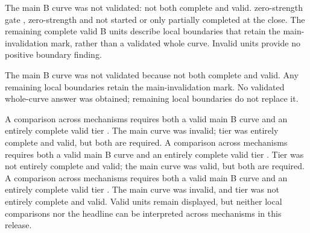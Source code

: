 The main B curve was not validated:    not both complete and valid.   zero-strength gate ,  zero-strength  and   not started or only partially completed at the close. %
The remaining complete valid B units describe local boundaries that retain the main-invalidation mark, rather than a validated whole curve. Invalid units provide no positive boundary finding. %

The main B curve was not validated because    not both complete and valid. Any remaining local boundaries retain the main-invalidation mark. %
No validated whole-curve answer was obtained; remaining local boundaries do not replace it.

A comparison across mechanisms requires both a valid main B curve and an entirely complete valid tier . The main curve was invalid; tier  was entirely complete and valid, but both are required. %
A comparison across mechanisms requires both a valid main B curve and an entirely complete valid tier . Tier  was not entirely complete and valid; the main curve was valid, but both are required. %
A comparison across mechanisms requires both a valid main B curve and an entirely complete valid tier . The main curve was invalid, and tier  was not entirely complete and valid. %
Valid units remain displayed, but neither local comparisons nor the headline can be interpreted across mechanisms in this release. %

